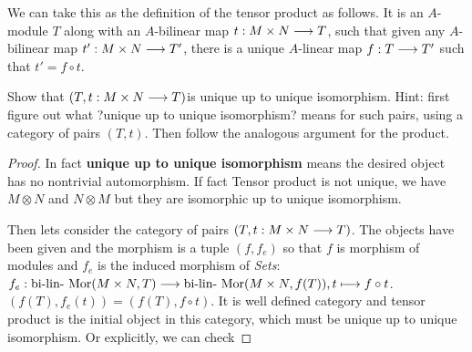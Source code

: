 \begin{exr}
We can take this as the definition of the tensor product as follows. It is an $A$-module $T$ along with an $A$-bilinear map $t: M \times N \longrightarrow T$, such that given any $A$-bilinear map $t':M\times N\longrightarrow T'$, there is a unique $A$-linear map $f:T \longrightarrow T'$ such that $t' =f\circ t$.

\begin{center}
\end{center}
  
Show that $(T,t:M\times N\longrightarrow T)$is unique up to unique isomorphism. Hint: first figure out what ?unique up to unique isomorphism? means for such pairs, using a category of pairs $(T, t)$. Then follow the analogous argument for the product.
\end{exr}
\begin{proof}
In fact \textbf{unique up to unique isomorphism} means the desired object has no nontrivial automorphism. If fact Tensor product is not unique, we have $M\otimes N$ and $N\otimes M$ but they are isomorphic up to unique isomorphism.

Then lets consider the category of pairs $(T,t: M\times N\longrightarrow T)$. The objects have been given and the morphism is a tuple $(f, f_{e})$ so that $f$ is  morphism of modules and $f_{e}$ is the induced morphism of \textit{Sets}: $f_e:\text{bi-lin-}\text{ Mor}(M\times N, T)\longrightarrow \text{bi-lin-}\text{ Mor}(M\times N, f(T)), t\longmapsto f\circ t$. $(f(T), f_{e}(t))=(f(T), f\circ t)$. It is well defined category and tensor product is the initial object in this category, which must be unique up to unique isomorphism. Or explicitly, we can check
\end{proof}


